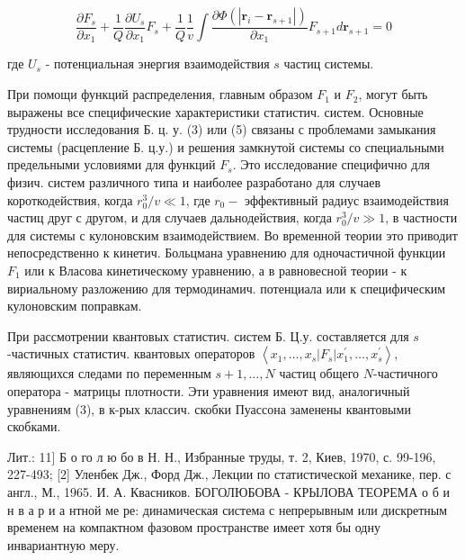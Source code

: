 \documentclass[10pt]{article}
\begin{document}
\[

\frac{\partial F_{s}}{\partial x_{1}}+\frac{1}{Q} \frac{\partial U_{s}}{\partial x_{1}} F_{s}+\frac{1}{Q} \frac{1}{v} \int \frac{\partial \Phi\left(\left|\boldsymbol{r}_{i}-\boldsymbol{r}_{s+1}\right|\right)}{\partial x_{1}} F_{s+1} d \boldsymbol{r}_{s+1}=0

\]



где $U_{s}$ - потенциальная энергия взаимодействия $s$ частиц системы.



При помощи функций распределения, главным образом $F_{1}$ и $F_{2}$, могут быть выражены все специфические характеристики статистич. систем. Основные трудности исследования Б. ц. у. (3) или (5) связаны с проблемами замыкания системы (расцепление Б. ц.у.) и решения замкнутой системы со специальными предельными условиями для функций $F_{s}$. Это исследование специфично для физич. систем различного типа и наиболее разработано для случаев короткодействия, когда $r_{0}^{3} / v \ll 1$, где $r_{0}-$ эффективный радиус взаимодействия частиц друг с другом, и для случаев дальнодействия, когда $r_{0}^{3} / v \gg 1$, в частности для системы с кулоновским взаимодействием. Во временной теории это приводит непосредственно к кинетич. Больцмана уравнению для одночастичной функции $F_{1}$ или к Власова кинетическому уравнению, а в равновесной теории - к вириальному разложению для термодинамич. потенциала или к специфическим кулоновским поправкам.



При рассмотрении квантовых статистич. систем Б. Ц.у. составляется для $s$-частичных статистич. квантовых операторов $\left\langle x_{1}, \ldots, x_{s}\left|F_{s}\right| x_{1}^{\prime}, \ldots, x_{s}^{\prime}\right\rangle$, являющихся следами по переменным $s+1, \ldots, N$ частиц общего $N$-частичного оператора - матрицы плотности. Эти уравнения имеют вид, аналогичный уравнениям (3), в к-рых классич. скобки Пуассона заменены квантовыми скобками.



Лит.: 11] Б о го л ю бо в Н. Н., Избранные труды, т. 2, Киев, 1970, с. 99-196, 227-493; [2] Уленбек Дж., Форд Дж., Лекции по статистической механике, пер. с англ., М., 1965. И. А. Квасников. БОГОЛЮБОВА - КРЫЛОВА ТЕОРЕМА о б и н в а р и а нтной ме ре: динамическая система с непрерывным или дискретным временем на компактном фазовом пространстве имеет хотя бы одну инвариантную меру.
\end{document}
